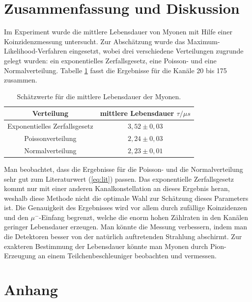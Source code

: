 \section{Zusammenfassung und Diskussion}
	Im Experiment wurde die mittlere Lebensdauer von Myonen mit Hilfe einer Koinzidenzmessung untersucht. Zur Abschätzung wurde das Maximum-Likelihood-Verfahren eingesetzt, wobei drei verschiedene Verteilungen zugrunde gelegt wurden: ein exponentielles Zerfallsgesetz, eine Poisson- und eine Normalverteilung. Tabelle \ref{tab:results} fasst die Ergebnisse für die Kanäle 20 bis 175 zusammen.
	\begin{table}[ht]
		\centering
		\begin{tabular}{c|c}
		Verteilung & mittlere Lebensdauer $\tau /\unit{\mu s}$\\
		\hline
		Exponentielles Zerfallsgesetz	&	$3,52 \pm 0,03$\\
		Poissonverteilung				&	$2,24 \pm 0,03$\\
		Normalverteilung 				&	$2,23 \pm 0,01$
		\end{tabular}
		\caption{Schätzwerte für die mittlere Lebensdauer der Myonen.}
		\label{tab:results}
	\end{table}
	Man beobachtet, dass die Ergebnisse für die Poisson- und die Normalverteilung sehr gut zum Literaturwert (\ref{eq:lit}) passen. Das exponentielle Zerfallsgesetz kommt nur mit einer anderen Kanalkonstellation an dieses Ergebnis heran, weshalb diese Methode nicht die optimale Wahl zur Schätzung dieses Parameters ist. Die Genauigkeit des Ergebnisses wird vor allem durch zufällige Koinzidenzen und den $\mu^-$-Einfang begrenzt, welche die enorm hohen Zählraten in den Kanälen geringer Lebensdauer erzeugen. Man könnte die Messung verbessern, indem man die Detektoren besser von der natürlich auftretenden Strahlung abschirmt. Zur exakteren Bestimmung der Lebensdauer könnte man Myonen durch Pion-Erzeugung an einem Teilchenbeschleuniger beobachten und vermessen.
	

\newpage
\section{Anhang}
